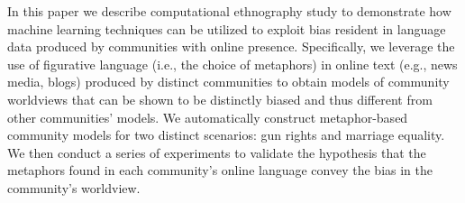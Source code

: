 In this paper we describe computational ethnography study to demonstrate how machine learning techniques can be utilized to exploit bias resident in language data produced by communities with online presence. Specifically, we leverage the use of figurative language (i.e., the choice of metaphors) in online text (e.g., news media, blogs) produced by distinct communities to obtain models of community worldviews that can be shown to be distinctly biased and thus different from other communities' models. We automatically construct metaphor-based community models for two distinct scenarios: gun rights and marriage equality. We then conduct a series of experiments to validate the hypothesis that the metaphors found in each community's online language convey the bias in the community's worldview.
